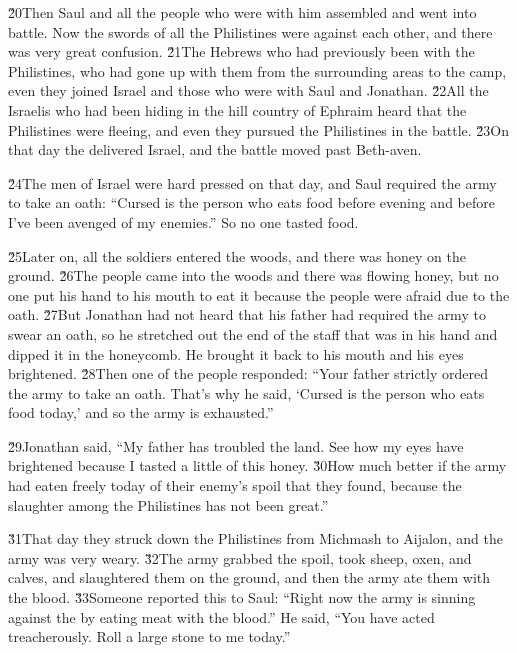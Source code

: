 \v{20}Then Saul and all the people who were with him assembled and went into battle. Now the swords of all the Philistines were against each other, and there was very great confusion. \v{21}The Hebrews who had previously been with the Philistines, who had gone up with them from the surrounding areas to the camp, even they joined Israel and those who were with Saul and Jonathan. \v{22}All the Israelis who had been hiding in the hill country of Ephraim heard that the Philistines were fleeing, and even they pursued the Philistines in the battle. \v{23}On that day the  delivered Israel, and the battle moved past Beth-aven.

\v{24}The men of Israel were hard pressed on that day, and Saul required the army to take an oath: ``Cursed is the person who eats food before evening and before I've been avenged of my enemies.'' So no one tasted food.

\v{25}Later on, all the soldiers entered the woods, and there was honey on the ground. \v{26}The people came into the woods and there was flowing honey, but no one put his hand to his mouth to eat it because the people were afraid due to the oath. \v{27}But Jonathan had not heard that his father had required the army to swear an oath, so he stretched out the end of the staff that was in his hand and dipped it in the honeycomb. He brought it back to his mouth and his eyes brightened. \v{28}Then one of the people responded: ``Your father strictly ordered the army to take an oath. That's why he said, `Cursed is the person who eats food today,' and so the army is exhausted.''

\v{29}Jonathan said, ``My father has troubled the land. See how my eyes have brightened because I tasted a little of this honey. \v{30}How much better if the army had eaten freely today of their enemy's spoil that they found, because the slaughter among the Philistines has not been great.''

\v{31}That day they struck down the Philistines from Michmash to Aijalon, and the army was very weary. \v{32}The army grabbed the spoil, took sheep, oxen, and calves, and slaughtered them on the ground, and then the army ate them with the blood. \v{33}Someone reported this to Saul: ``Right now the army is sinning against the  by eating meat with the blood.'' He said, ``You have acted treacherously. Roll a large stone to me today.''

